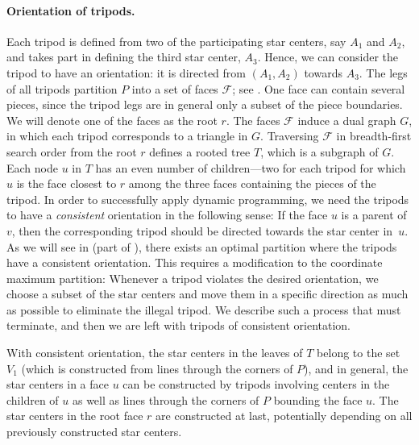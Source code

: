 \documentclass{theoretics}
\begin{document}
\paragraph{Orientation of tripods.}
Each tripod is defined from two of the participating star centers, say $A_1$ and $A_2$, and takes part in defining the third star center, $A_3$.
Hence, we can consider the tripod to have an orientation: it is directed from $(A_1, A_2)$ towards $A_3$.
The legs of all tripods partition $P$ into a set of faces $\mathcal F$; see .
One face can contain several pieces, since the tripod legs are in general only a subset of the piece boundaries.
We will denote one of the faces as the root $r$.
The faces $\mathcal F$ induce a dual graph $G$, in which each tripod corresponds to a triangle in $G$.
Traversing $\mathcal F$ in breadth-first search order from the root $r$ defines a rooted tree $T$, which is a subgraph of $G$.
Each node $u$ in $T$ has an even number of children---two for each tripod for which $u$ is the face closest to $r$ among the three faces containing the pieces of the tripod.
In order to successfully apply dynamic programming, we need the tripods to have a \emph{consistent} orientation in the following sense:
If the face $u$ is a parent of $v$, then the corresponding tripod should be directed towards the star center in~$u$.
As we will see in  (part of ), there exists an optimal partition where the tripods have a consistent orientation.
This requires a modification to the coordinate maximum partition: Whenever a tripod violates the desired orientation, we choose a subset of the star centers and move them in a specific direction as much as possible to eliminate the illegal tripod.
We describe such a process that must terminate, and then we are left with tripods of consistent orientation.

With consistent orientation, the star centers in the leaves of $T$ belong to the set $V_1$ (which is constructed from lines through the corners of $P$), and in general, the star centers in a face $u$ can be constructed by tripods involving centers in the children of $u$ as well as lines through the corners of $P$ bounding the face $u$.
The star centers in the root face $r$ are constructed at last, potentially depending on all previously constructed star centers.
\end{document}
